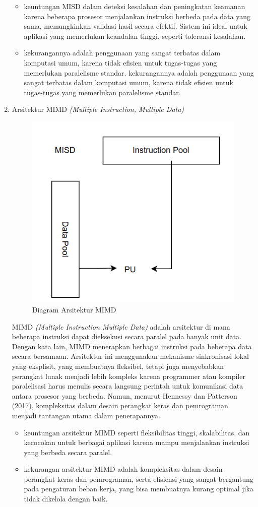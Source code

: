 \documentclass[12pt]{article}
\begin{document}
\begin{enumerate}
    \begin{itemize}
        \item keuntungan MISD dalam deteksi kesalahan dan peningkatan keamanan karena beberapa prosesor menjalankan instruksi berbeda pada data yang sama, memungkinkan validasi hasil secara efektif. Sistem ini ideal untuk aplikasi yang memerlukan keandalan tinggi, seperti toleransi kesalahan.
        \item kekurangannya adalah penggunaan yang sangat terbatas dalam komputasi umum, karena tidak efisien untuk tugas-tugas yang memerlukan paralelisme standar. kekurangannya adalah penggunaan yang sangat terbatas dalam komputasi umum, karena tidak efisien untuk tugas-tugas yang memerlukan paralelisme standar. 
    \end{itemize}
    \item Arsitektur MIMD \textit{(Multiple Instruction, Multiple Data)}

        \noindent
        \begin{figure}[H]
            \centering
            \includegraphics[width=0.4\linewidth]{asset/image8.png}
            \caption{Diagram Arsitektur MIMD}
            \label{fig:Diagram-Arsitektur-MIMD}
        \end{figure}
        
    MIMD \textit{(Multiple Instruction Multiple Data)} adalah arsitektur di mana beberapa instruksi dapat dieksekusi secara paralel pada banyak unit data. Dengan kata lain, MIMD menerapkan berbagai instruksi pada beberapa data secara bersamaan. Arsitektur ini menggunakan mekanisme sinkronisasi lokal yang eksplisit, yang membuatnya fleksibel, tetapi juga menyebabkan perangkat lunak menjadi lebih kompleks karena programmer atau kompiler paralelisasi harus menulis secara langsung perintah untuk komunikasi data antara prosesor yang berbeda. Namun, menurut Hennessy dan Patterson (2017), kompleksitas dalam desain perangkat keras dan pemrograman menjadi tantangan utama dalam penerapannya.

    \begin{itemize}
    
        \item keuntungan arsitektur MIMD seperti fleksibilitas tinggi, skalabilitas, dan kecocokan untuk berbagai aplikasi karena mampu menjalankan instruksi yang berbeda secara paralel.

        \item kekurangan arsitektur MIMD adalah kompleksitas dalam desain perangkat keras dan pemrograman, serta efisiensi yang sangat bergantung pada pengaturan beban kerja, yang bisa membuatnya kurang optimal jika tidak dikelola dengan baik.
    \end{itemize}
\end{enumerate}
\end{document}
